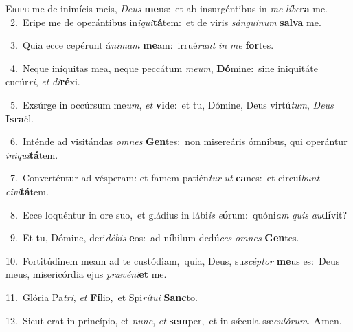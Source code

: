\lettrine{\initial\textcolor{\initialcolor}{E}}{ripe} me de inimícis meis, \textit{De}\-\textit{us} \textbf{me}\-us:~\star et ab insurgéntibus in \textit{me} \textit{lí}\-\textit{be}\textbf{ra} me.\\
{\numbfont\textcolor{\numbcolor}{~2.}}~Eripe me de operántibus in\-\textit{i}\-\textit{qui}\textbf{tá}tem:~\star et de viris \textit{sán}\-\textit{gui}\textit{num} \textbf{sal}\-\textbf{va} me.\par
{\numbfont\textcolor{\numbcolor}{~3.}}~Quia ecce cepérunt á\-\textit{ni}\-\textit{mam} \textbf{me}\-am:~\star irrué\textit{runt} \textit{in} \textit{me} \textbf{for}\-tes.\par
{\numbfont\textcolor{\numbcolor}{~4.}}~Neque iníquitas mea, neque peccátum \textit{me}\-\textit{um}, \textbf{Dó}\-mine:~\star sine iniquitáte cucúr\-\textit{ri}\-, \textit{et} \textit{di}\-\textbf{ré}xi.\par
{\numbfont\textcolor{\numbcolor}{~5.}}~Exsúrge in occúrsum me\-\textit{um}\-, \textit{et} \textbf{vi}\-de:~\star et tu, Dómine, Deus virtú\-\textit{tum}\-, \textit{De}\-\textit{us} \textbf{Is}\-\textbf{ra}ël.\par
{\numbfont\textcolor{\numbcolor}{~6.}}~Inténde ad visitándas \textit{om}\-\textit{nes} \textbf{Gen}\-tes:~\star non misereáris ómnibus, qui operántur \textit{in}\-\textit{i}\textit{qui}\textbf{tá}tem.\par
{\numbfont\textcolor{\numbcolor}{~7.}}~Converténtur ad vésperam: et famem patién\textit{tur} \textit{ut} \textbf{ca}\-nes:~\star et circuí\textit{bunt} \textit{ci}\-\textit{vi}\textbf{tá}tem.\par
{\numbfont\textcolor{\numbcolor}{~8.}}~Ecce loquéntur in ore suo,~\dagger et gládius in lábi\textit{is} \textit{e}\-\textbf{ó}rum:~\star quóni\textit{am} \textit{quis} \textit{au}\-\textbf{dí}vit?\par
{\numbfont\textcolor{\numbcolor}{~9.}}~Et tu, Dómine, deri\-\textit{dé}\-\textit{bis} \textbf{e}\-os:~\star ad níhilum dedú\textit{ces} \textit{om}\-\textit{nes} \textbf{Gen}\-tes.\par
{\numbfont\textcolor{\numbcolor}{10.}}~Fortitúdinem meam ad te custódiam,~\dagger quia, Deus, su\-\textit{scép}\-\textit{tor} \textbf{me}\-us es:~\star Deus meus, misericórdia ejus \textit{præ}\-\textit{vé}\textit{ni}\textbf{et} me.\par
{\numbfont\textcolor{\numbcolor}{11.}}~Glória Pa\-\textit{tri}\-, \textit{et} \textbf{Fí}\-lio,~\star et Spi\-\textit{rí}\-\textit{tu}\textit{i} \textbf{Sanc}\-to.\par
{\numbfont\textcolor{\numbcolor}{12.}}~Sicut erat in princípio, et \textit{nunc}\-, \textit{et} \textbf{sem}\-per,~\star et in sǽcula sæ\-\textit{cu}\-\textit{ló}\textit{rum}. \textbf{A}\-men.\par
